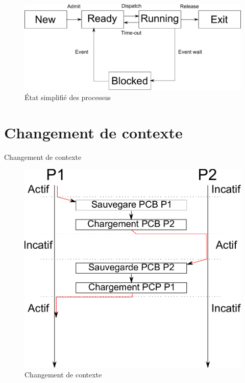 \section{\sectitle}
\begin{frame}{\sectitle}
\begin{figure}
\includegraphics[width=.9\textwidth]{images/StateSimple.pdf}
\caption{État simplifié des processus}
\end{figure}
\end{frame}


\def\sectitle{Changement de contexte}
\section{\sectitle}

\begin{frame}{\sectitle}
\begin{figure}
\includegraphics[width=.9\textwidth]{images/ContextChange.pdf}
\caption{Changement de contexte}
\end{figure}
\end{frame}

